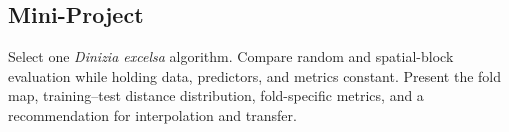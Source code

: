 \subsection*{Mini-Project}
Select one \textit{Dinizia excelsa} algorithm. Compare random and spatial-block
evaluation while holding data, predictors, and metrics constant. Present the
fold map, training--test distance distribution, fold-specific metrics, and a
recommendation for interpolation and transfer.
